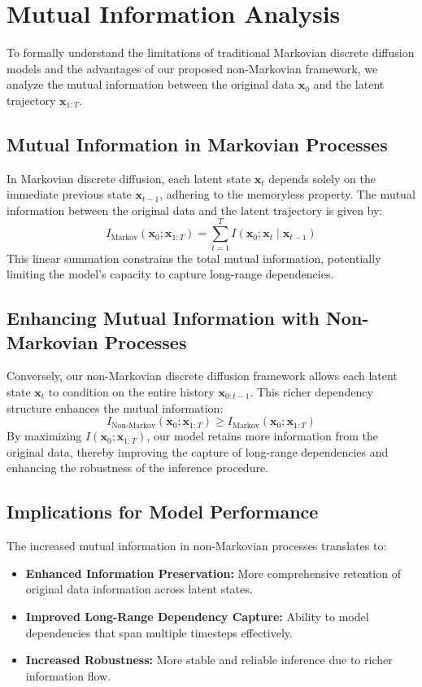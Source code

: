 \section{Mutual Information Analysis}
\label{sec:mutual_information}

To formally understand the limitations of traditional Markovian discrete diffusion models and the advantages of our proposed non-Markovian framework, we analyze the mutual information between the original data \(\mathbf{x}_0\) and the latent trajectory \(\mathbf{x}_{1:T}\).

\subsection{Mutual Information in Markovian Processes}

In Markovian discrete diffusion, each latent state \(\mathbf{x}_t\) depends solely on the immediate previous state \(\mathbf{x}_{t-1}\), adhering to the memoryless property. The mutual information between the original data and the latent trajectory is given by:
\[
I_{\text{Markov}}(\mathbf{x}_0; \mathbf{x}_{1:T}) = \sum_{t=1}^T I(\mathbf{x}_0; \mathbf{x}_t \mid \mathbf{x}_{t-1})
\]
This linear summation constrains the total mutual information, potentially limiting the model's capacity to capture long-range dependencies.

\subsection{Enhancing Mutual Information with Non-Markovian Processes}

Conversely, our non-Markovian discrete diffusion framework allows each latent state \(\mathbf{x}_t\) to condition on the entire history \(\mathbf{x}_{0:t-1}\). This richer dependency structure enhances the mutual information:
\[
I_{\text{Non-Markov}}(\mathbf{x}_0; \mathbf{x}_{1:T}) \geq I_{\text{Markov}}(\mathbf{x}_0; \mathbf{x}_{1:T})
\]
By maximizing \(I(\mathbf{x}_0; \mathbf{x}_{1:T})\), our model retains more information from the original data, thereby improving the capture of long-range dependencies and enhancing the robustness of the inference procedure.

\subsection{Implications for Model Performance}

The increased mutual information in non-Markovian processes translates to:
\begin{itemize}
    \item \textbf{Enhanced Information Preservation:} More comprehensive retention of original data information across latent states.
    \item \textbf{Improved Long-Range Dependency Capture:} Ability to model dependencies that span multiple timesteps effectively.
    \item \textbf{Increased Robustness:} More stable and reliable inference due to richer information flow.
\end{itemize}

